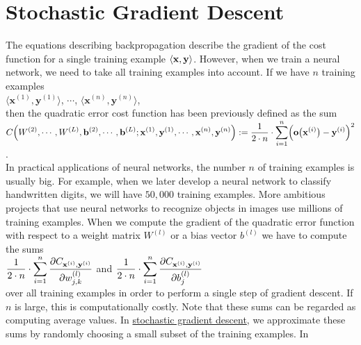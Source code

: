 \section{Stochastic Gradient Descent}
The equations describing backpropagation describe the gradient of the cost function for a single training
example $\pair(\mathbf{x}, \mathbf{y})$.  However, when we train a neural network, we need to take all training
examples into account.  If we have $n$ training examples
\\[0.2cm]
\hspace*{1.3cm}
$\langle\mathbf{x}^{(1)}, \mathbf{y}^{(1)}\rangle$,
$\cdots$,
$\langle\mathbf{x}^{(n)}, \mathbf{y}^{(n)}\rangle$,
\\[0.2cm]
then the quadratic error cost function has been previously defined as the sum
\\[0.2cm]
\hspace*{1.3cm}
$\displaystyle C\Bigr(W^{(2)}, \cdots, W^{(L)}, \mathbf{b}^{(2)}, \cdots, \mathbf{b}^{(L)};
     \mathbf{x}^{(1)}, \mathbf{y}^{(1)}, \cdots, \mathbf{x}^{(n)},\mathbf{y}^{(n)} \Bigr) := 
 \frac{1}{2 \cdot n} \cdot \sum\limits_{i=1}^n \Bigl(\mathbf{o}\bigl(\mathbf{x}^{(i)}\bigr) - \mathbf{y}^{(i)}\Bigr)^2
$.
\\[0.2cm]
In practical applications of neural networks, the number $n$ of training examples is usually big.  For example, 
when we later develop a neural network to classify handwritten digits, we will have $50,000$ training examples.  More
ambitious projects that use neural networks to recognize objects in images use millions of training examples.
When we compute the gradient of the quadratic error function with respect to a weight matrix $W^{(l)}$ or a
bias vector $b^{(l)}$ we have to compute the sums 
\\[0.2cm]
\hspace*{1.3cm}
$\displaystyle \frac{1}{2\cdot n} \cdot \sum\limits_{i=1}^n \frac{\partial C_{\mathbf{x}^{(i)}, \mathbf{y}^{(i)}}}{\partial w_{j,k}^{(l)}}$
\quad and \quad
$\displaystyle \frac{1}{2\cdot n} \cdot \sum\limits_{i=1}^n \frac{\partial C_{\mathbf{x}^{(i)}, \mathbf{y}^{(i)}}}{\partial b_{j}^{(l)}}$
\\[0.2cm]
over all training examples in order to perform a single step of gradient descent.  If $n$ is large, this is
computationally costly.  Note that these sums can be regarded as computing average values.  In 
\href{https://en.wikipedia.org/wiki/Stochastic_gradient_descent}{stochastic gradient descent},
we approximate these sums by randomly choosing a small subset of the training examples.  In
